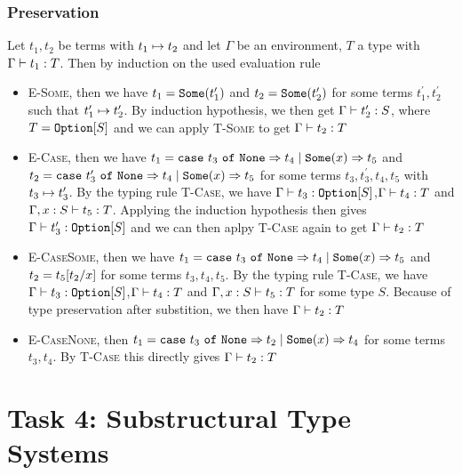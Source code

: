 \documentclass{article}
\newcommand{\tyoption}[1]{\ensuremath\mathtt{Option}[#1]}
\newcommand{\some}[1]{\ensuremath\mathtt{Some}(#1)}
\newcommand{\none}{\ensuremath\mathtt{None}}
\newcommand{\somecase}[4]{\ensuremath\mathtt{case}\ #1\ \mathtt{of}\ \none \Rightarrow #2 \mid \some{#3} \Rightarrow #4}
\newcommand{\typeinf}[3]{\ensuremath#1\vdash#2:#3}
\newcommand{\eval}[2]{\ensuremath#1\mapsto#2}
\newcommand{\subst}[3]{\ensuremath #1[#2/#3]}
\begin{document}
\subsubsection{Preservation}
Let $t_1,t_2$ be terms with $\eval{t_1}{t_2}$ and let $\Gamma$ be an environment, $T$ a type with $\typeinf{\Gamma}{t_1}{T}$. 
Then by induction on the used evaluation rule
\begin{itemize}
\item \textsc{E-Some}, then we have $t_1 = \some{t_1^{\prime}}$ and $t_2 = \some{t_2^{\prime}}$ for some terms $t_1^{\prime},t_2^{\prime}$ such that $\eval{t_1^{\prime}}{t_2^{\prime}}$. By induction hypothesis, we then get $\typeinf{\Gamma}{t_2^{\prime}}{S}$, where $T=\tyoption{S}$ and we can apply \textsc{T-Some} to get $\typeinf{\Gamma}{t_2}{T}$
\item \textsc{E-Case}, then we have $t_1 = \somecase{t_3}{t_4}{x}{t_5}$ and $t_2 = \somecase{t_3^{\prime}}{t_4}{x}{t_5}$ for some terms $t_3,t_3^{\prime},t_4,t_5$ with $\eval{t_3}{t_3^{\prime}}$.
By the typing rule \textsc{T-Case}, we have $\typeinf{\Gamma}{t_3}{\tyoption{S}}$,$\typeinf{\Gamma}{t_4}{T}$ and $\typeinf{\Gamma,x:S}{t_5}{T}$. 
Applying the induction hypothesis then gives $\typeinf{\Gamma}{t_3^{\prime}}{\tyoption{S}}$ and we can then aplpy \textsc{T-Case} again to get $\typeinf{\Gamma}{t_2}{T}$
\item \textsc{E-CaseSome}, then we have $t_1 = \somecase{t_3}{t_4}{x}{t_5}$ and $t_2 = \subst{t_5}{t_2}{x}$ for some terms $t_3,t_4,t_5$. 
By the typing rule \textsc{T-Case}, we have $\typeinf{\Gamma}{t_3}{\tyoption{S}}$,$\typeinf{\Gamma}{t_4}{T}$ and $\typeinf{\Gamma,x:S}{t_5}{T}$ for some type $S$.
Because of type preservation after substition, we then have $\typeinf{\Gamma}{t_2}{T}$ 
\item \textsc{E-CaseNone}, then $t_1 = \somecase{t_3}{t_2}{x}{t_4}$ for some terms $t_3,t_4$. 
By \textsc{T-Case} this directly gives $\typeinf{\Gamma}{t_2}{T}$
\end{itemize}

\section*{Task 4: Substructural Type Systems}
\end{document}
